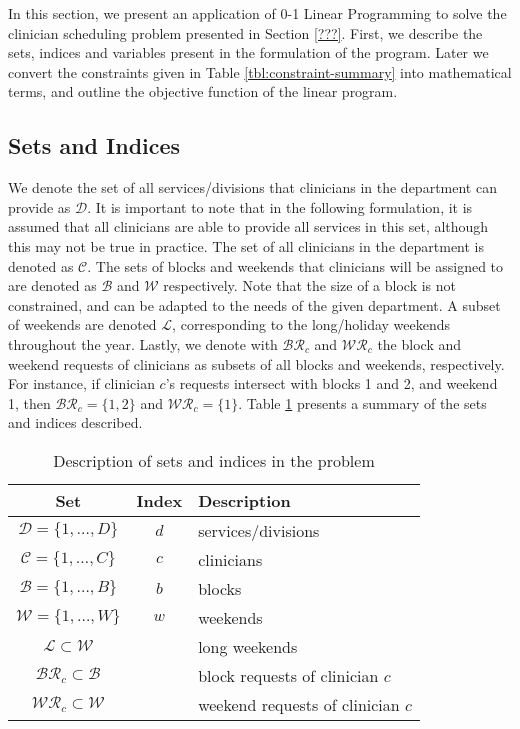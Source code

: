 In this section, we present an application of 0-1 Linear Programming to solve the clinician scheduling problem presented in Section \ref{???}. First, we describe the sets, indices and variables present in the formulation of the program. Later we convert the constraints given in Table \ref{tbl:constraint-summary} into mathematical terms, and outline the objective function of the linear program.

\subsection{Sets and Indices}
We denote the set of all services/divisions that clinicians in the department can provide as $\mathcal{D}$. It is important to note that in the following formulation, it is assumed that all clinicians are able to provide all services in this set, although this may not be true in practice. The set of all clinicians in the department is denoted as $\mathcal{C}$. The sets of blocks and weekends that clinicians will be assigned to are denoted as $\mathcal{B}$ and $\mathcal{W}$ respectively. Note that the size of a block is not constrained, and can be adapted to the needs of the given department. A subset of weekends are denoted $\mathcal{L}$, corresponding to the long/holiday weekends throughout the year. Lastly, we denote with $\mathcal{BR}_c$ and $\mathcal{WR}_c$ the block and weekend requests of clinicians as subsets of all blocks and weekends, respectively. For instance, if clinician $c$'s requests intersect with blocks 1 and 2, and weekend 1, then $\mathcal{BR}_c = \{1, 2\}$ and $\mathcal{WR}_c = \{1\}$. Table \ref{tbl:sets-indices} presents a summary of the sets and indices described. 

\begin{table}[h]
	\centering
	\begin{tabular}{ c c l }
		\hline
		\textbf{Set}                         & \textbf{Index} & \textbf{Description}              \\ \hline
		$\mathcal{D} = \{1, \ldots, D \}$    & $d$            & services/divisions                \\
		$\mathcal{C} = \{1, \ldots, C \}$    & $c$            & clinicians                        \\
		$\mathcal{B} = \{1, \ldots, B \}$    & $b$            & blocks                            \\
		$\mathcal{W} = \{1, \ldots, W \}$    & $w$            & weekends                          \\
		$\mathcal{L} \subset \mathcal{W}$    &                & long weekends                     \\
		$\mathcal{BR}_c \subset \mathcal{B}$ &                & block requests of clinician $c$   \\
		$\mathcal{WR}_c \subset \mathcal{W}$ &                & weekend requests of clinician $c$
	\end{tabular}
	\caption{Description of sets and indices in the problem}
	\label{tbl:sets-indices}
\end{table}

